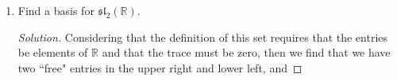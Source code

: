 \documentclass[12pt]{article}
\theoremstyle{definition}
\theoremstyle{definition}
\newenvironment{solution}
  {\renewcommand\qedsymbol{$\blacksquare$}\begin{proof}[Solution]}
  {\end{proof}}
\begin{document}
\begin{enumerate}
\begin{enumerate}[label=(\alph*)]
\begin{proof}
\begin{equation*}
                        \end{equation*}
                        then 
                        \begin{equation*}
                            \begin{split}
                                [u, v]&=\begin{pmatrix}a&b\\c&d
                                \end{pmatrix}\begin{pmatrix}e&f\\g&h\end{pmatrix}-\begin{pmatrix}e&f\\g&h
                                \end{pmatrix}\begin{pmatrix}a&b\\c&d\end{pmatrix}\\
                                &=\begin{pmatrix}ae+bg&af+bh\\ce+dg&cf+dh\end{pmatrix}-
                                \begin{pmatrix}ea+fc&eb+fd\\ga+hc&gb+hd\end{pmatrix} \\
                                &=\begin{pmatrix}bg-fc&af+bh-eb-fd\\ce+dg-ga-he&cf-gb\end{pmatrix}. 
                            \end{split}
                        \end{equation*}
                        By the commutativity of the reals, it follows
                        that $\text{tr}([u, v])=bg-fc+cf-gb=0$. Hence,
                        $[u, v]\in\mathfrak{sl}_{2}(\mathbb{R})$.
                    \end{proof}
                \item Find a basis for $\mathfrak{sl}_{2}(\mathbb{R})$. 
                    \begin{solution}
                        Considering that the definition of this set requires
                        that the entries be elements of $\mathbb{R}$ and that
                        the trace must be zero, then we find that we have two
                        ``free" entries in the upper right and lower left, and

\end{solution}
\end{enumerate}
\end{enumerate}
\end{document}
